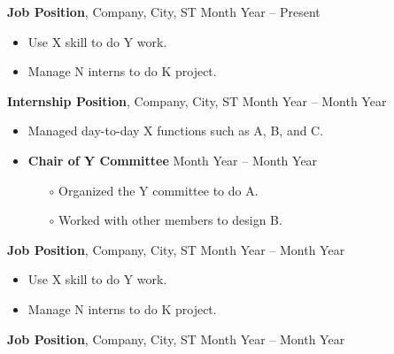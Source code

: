 \documentclass[11pt]{article}
\begin{document}
    \textbf{Job Position}, Company, City, ST \hfill Month Year – Present

    \begin{itemize}[noitemsep,nolistsep]
        \item Use X skill to do Y work.
    
        \item Manage N interns to do K project.
    \end{itemize}
    \vspace{1mm}

    \textbf{Internship Position}, Company, City, ST \hfill Month Year – Month Year

    \begin{itemize}[noitemsep,nolistsep]
        \item Managed day-to-day X functions such as A, B, and C.
    
        \item \textbf{Chair of Y Committee} \hfill Month Year – Month Year
            \begin{itemize}[noitemsep,nolistsep]
                \item[$\circ$] Organized the Y committee to do A.
    
                \item[$\circ$] Worked with other members to design B.
            \end{itemize}
    \end{itemize}
    \vspace{1mm}
    
    \textbf{Job Position}, Company, City, ST \hfill Month Year – Month Year

    \begin{itemize}[noitemsep,nolistsep]
        \item Use X skill to do Y work.
    
        \item Manage N interns to do K project.
    \end{itemize}
    \vspace{1mm}

    \textbf{Job Position}, Company, City, ST \hfill Month Year – Month Year
\end{document}
